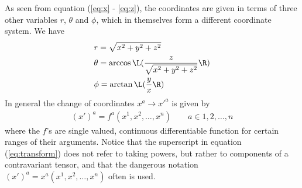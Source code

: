\documentclass[a4paper, 12pt]{article}
\begin{document}
As seen from equation (\ref{eq:x} - \ref{eq:z}), the coordinates 
are given in terms of three other variables $r$, $\theta$ and $\phi$, which in 
themselves form a different coordinate system. We have
%
\begin{align*}
 &r = \sqrt{x^2+y^2+z^2}\\
 &\theta = \arccos\L(\frac{z}{\sqrt{x^2 + y^2 + z^2}}\R)\\
 &\phi = \arctan\L(\frac{y}{x}\R)
\end{align*}
%
In general the change of coordinates $x^a \to x'^a$ is given by
%
\begin{align}
 (x')^a = f^a(x^1,x^2,\ldots,x^n)\qquad a\in{1,2,\ldots,n} \label{eq:transform}
\end{align}
%
where the $f$'s are single valued, continuous differentiable function for 
certain ranges of their arguments. Notice that the superscript in equation 
(\ref{eq:transform}) does not refer to taking powers, but rather to components 
of a contravariant tensor, and that the dangerous notation $(x')^a = 
x^a(x^1,x^2,\ldots,x^n)$ often is used.
\end{document}
